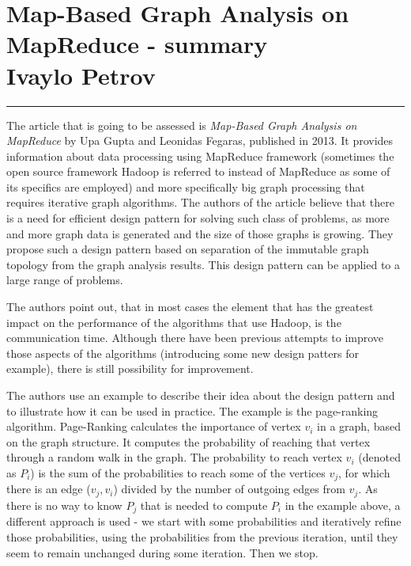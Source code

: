 \documentclass[12pt]{article}
\newcommand{\hr}{\rule{\linewidth}{0.1mm}}
\theoremstyle{plain}
\begin{document}
\section*{\centering
  Map-Based Graph Analysis on MapReduce - summary \\
  Ivaylo Petrov 
}

\hr

The article that is going to be assessed is \emph{Map-Based Graph Analysis on
MapReduce} by Upa Gupta and Leonidas Fegaras, published in 2013. It provides
information about data processing using MapReduce framework (sometimes the open
source framework Hadoop is referred to instead of MapReduce as some of its 
specifics are employed) and more specifically big graph processing that
requires iterative graph algorithms. The authors of the article believe that
there is a need for efficient design pattern for solving such class of
problems, as more and more graph data is generated and the size of those graphs
is growing. They propose such a design pattern based on separation of the
immutable graph topology from the graph analysis results. This design pattern
can be applied to a large range of problems.  

  The authors point out, that in most cases the element that has the greatest
  impact on the performance of the algorithms that use Hadoop, is the
  communication time. Although there have been previous attempts to improve
  those aspects of the algorithms (introducing some new design patters for
  example), there is still possibility for improvement.  

  The authors use an example to describe their idea about the design pattern
  and to illustrate how it can be used in practice. The example is the
  page-ranking algorithm. Page-Ranking calculates the importance of vertex
  $v_i$ in a graph, based on the graph structure. It computes the probability
  of reaching that vertex through a random walk in the graph. The probability
  to reach vertex $v_i$ (denoted as $P_i$) is the sum of the probabilities to
  reach some of the vertices $v_j$, for which there is an edge ($v_j, v_i$)
  divided by the number of outgoing edges from $v_j$. As there is no way to
  know $P_j$ that is needed to compute $P_i$ in the example above, a different
  approach is used - we start with some probabilities and iteratively refine
  those probabilities, using the probabilities from the previous iteration,
  until they seem to remain unchanged during some iteration. Then we stop.
  
\end{document}
